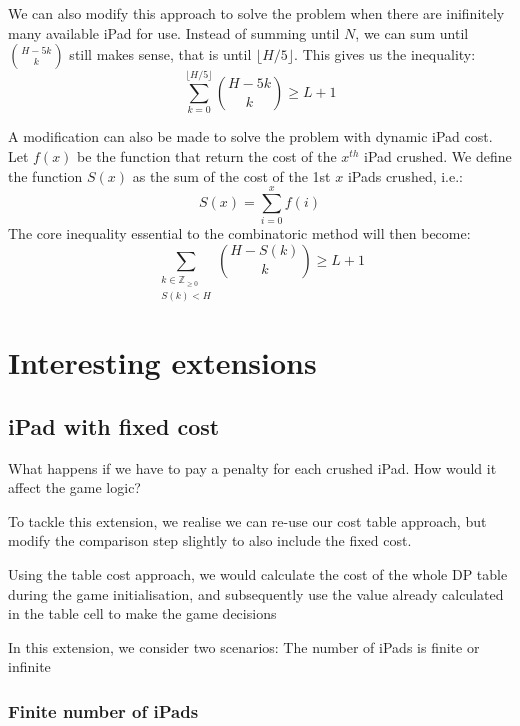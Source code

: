 \documentclass[12pt,a4paper,oneside]{report}
\begin{document}
We can also modify this approach to solve the problem when there are inifinitely many available iPad for use. Instead of summing until $N$, we can sum until ${H-5k \choose k}$ still makes sense, that is until $\lfloor H/5 \rfloor$. This gives us the inequality: \[\sum_{k=0}^{\lfloor H/5 \rfloor} {H-5k \choose k} \geq L+1\]

A modification can also be made to solve the problem with dynamic iPad cost. Let $f(x)$ be the function that return the cost of the $x^{th}$ iPad crushed. We define the function $S(x)$ as the sum of the cost of the 1st $x$ iPads crushed, i.e.: \[S(x) = \sum_{i=0}^x f(i)\] The core inequality essential to the combinatoric method will then become: \[\sum_{\substack{k \in \mathbb{Z}_{\geq 0}\\ S(k) < H}} {H-S(k) \choose k} \geq L+1\]


\chapter{Interesting extensions}
\section{iPad with fixed cost}

What happens if we have to pay a penalty for each crushed iPad. How would it affect the game logic?

To tackle this extension, we realise we can re-use our cost table approach, but modify the comparison step slightly to also include the fixed cost. 

Using the table cost approach, we would calculate the cost of the whole DP table during the game initialisation, and subsequently use the value already calculated in the table cell to make the game decisions

In this extension, we consider two scenarios: The number of iPads is finite or infinite

\subsection{Finite number of iPads}
\end{document}
